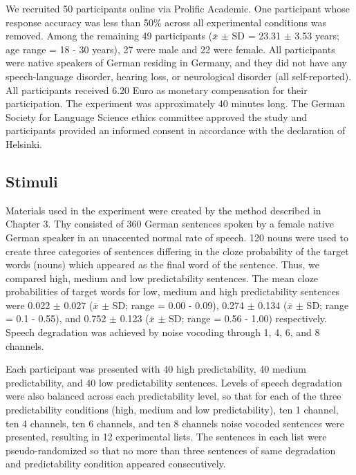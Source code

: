 \documentclass[a4paper, nobind]{templates/ociamthesis}
\begin{document}
We recruited 50 participants online via Prolific Academic.
One participant whose response accuracy was less than 50\% across all experimental conditions was removed.
Among the remaining 49 participants (\(\bar{x}\) \(\pm\) SD = 23.31 \(\pm\) 3.53 years; age range = 18 - 30 years), 27 were male and 22 were female.
All participants were native speakers of German residing in Germany, and they did not have any speech-language disorder, hearing loss, or neurological disorder (all self-reported).
All participants received 6.20 Euro as monetary compensation for their participation.
The experiment was approximately 40 minutes long.
The German Society for Language Science ethics committee approved the study and participants provided an informed consent in accordance with the declaration of Helsinki.

\hypertarget{stimuli}{%
\subsection{Stimuli}\label{stimuli}}

Materials used in the experiment were created by the method described in Chapter 3.
Thy consisted of 360 German sentences spoken by a female native German speaker in an unaccented normal rate of speech.
120 nouns were used to create three categories of sentences differing in the cloze probability of the target words (nouns) which appeared as the final word of the sentence.
Thus, we compared high, medium and low predictability sentences.
The mean cloze probabilities of target words for low, medium and high predictability sentences were 0.022 \(\pm\) 0.027 (\(\bar{x}\) \(\pm\) SD; range = 0.00 - 0.09), 0.274 \(\pm\) 0.134 (\(\bar{x}\) \(\pm\) SD; range = 0.1 - 0.55), and 0.752 \(\pm\) 0.123 (\(\bar{x}\) \(\pm\) SD; range = 0.56 - 1.00) respectively.
Speech degradation was achieved by noise vocoding through 1, 4, 6, and 8 channels.

Each participant was presented with 40 high predictability, 40 medium predictability, and 40 low predictability sentences.
Levels of speech degradation were also balanced across each predictability level, so that for each of the three predictability conditions (high, medium and low predictability), ten 1 channel, ten 4 channels, ten 6 channels, and ten 8 channels noise vocoded sentences were presented, resulting in 12 experimental lists.
The sentences in each list were pseudo-randomized so that no more than three sentences of same degradation and predictability condition appeared consecutively.
\end{document}
